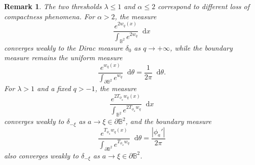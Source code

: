 \documentclass[11pt,a4paper,twoside]{amsart}
\newtheorem{remark}[theorem]{Remark}
\newtheorem{sketch proof}{Sketch of the proof}[section]
\newcommand{\dd}{\mathop{}\!\mathrm{d}}
\begin{document}
    \begin{remark}
        The two thresholds $\lambda\leq 1$ and $\alpha\leq 2$ correspond to different loss of compactness phenomena.
        For $\alpha>2$, the measure
        \[
        \frac{e^{2w_q(x)}}{
        \int_{\mathbb{B}^2}e^{2w_q}
        }
        \dd x
        \]
        converges weakly to the Dirac measure $\delta_0$ as $q\to+\infty$, while the boundary measure remains the uniform measure
        \[
        \frac{e^{w_q(x)}}{
        \int_{\partial \mathbb{B}^2}e^{w_q}
        }
        \dd \theta
        =\frac{1}{2\pi}\dd \theta.
        \]
        For $\lambda>1$ and a fixed $q>-1$, the measure
        \[
        \frac{e^{2T_{\phi_a}w_q(x)}}{
        \int_{\mathbb{B}^2}e^{2T_{\phi_a}w_q}
        }
        \dd x
        \]
        converges weakly to $\delta_{-\xi}$ as 
        $a\to\xi\in\partial\mathbb{B}^2$, and the boundary measure
        \[
        \frac{e^{T_{\phi_a}w_q(x)}}{
        \int_{\partial\mathbb{B}^2}
        e^{T_{\phi_a}w_q}
        }
        \dd \theta
        =\frac{|\phi_a'|}{2\pi}
        \]
        also converges weakly to $\delta_{-\xi}$ as 
        $a\to\xi\in\partial\mathbb{B}^2$.
    \end{remark}

\end{document}
